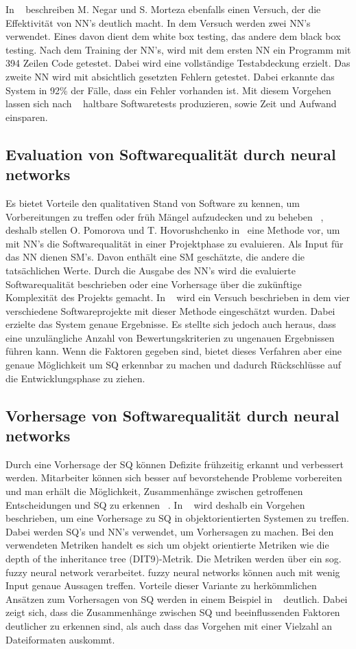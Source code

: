 \noindent In ~\cite{Majma2014} beschreiben M. Negar und S. Morteza ebenfalls einen Versuch, der die Effektivität von NN's deutlich macht. In dem Versuch werden zwei NN's verwendet. Eines davon dient dem white box testing, das andere dem black box testing. Nach dem Training der NN's, wird mit dem ersten NN ein Programm mit 394 Zeilen Code getestet. Dabei wird eine vollständige Testabdeckung erzielt. Das zweite NN wird mit absichtlich gesetzten Fehlern getestet. Dabei erkannte das System in 92\% der Fälle, dass ein Fehler vorhanden ist. Mit diesem Vorgehen lassen sich nach ~\cite{Majma2014} haltbare Softwaretests produzieren, sowie Zeit und Aufwand einsparen.

\subsection{Evaluation von Softwarequalität durch neural networks}
Es bietet Vorteile den qualitativen Stand von Software zu kennen, um Vorbereitungen zu treffen oder früh Mängel aufzudecken und zu beheben ~\cite{Pomorova2013}, deshalb stellen O. Pomorova und T. Hovorushchenko in~\cite{Pomorova2013} eine Methode vor, um mit NN's die Softwarequalität in einer Projektphase zu evaluieren. Als Input für das NN dienen SM's. Davon enthält eine SM geschätzte, die andere die tatsächlichen Werte.
Durch die Ausgabe des NN's wird die evaluierte Softwarequalität beschrieben oder eine Vorhersage über die zukünftige Komplexität des Projekts gemacht. 
In ~\cite{Pomorova2013} wird ein Versuch beschrieben in dem vier verschiedene Softwareprojekte mit dieser Methode eingeschätzt wurden. Dabei erzielte das System genaue Ergebnisse. Es stellte sich jedoch auch heraus, dass eine unzulängliche Anzahl von Bewertungskriterien zu ungenauen Ergebnissen führen kann.
Wenn die Faktoren gegeben sind, bietet dieses Verfahren aber eine genaue Möglichkeit um SQ erkennbar zu machen und dadurch Rückschlüsse auf die Entwicklungsphase zu ziehen.

\subsection{Vorhersage von Softwarequalität durch neural networks}
Durch eine Vorhersage der SQ können Defizite frühzeitig erkannt und verbessert werden. Mitarbeiter können sich besser auf bevorstehende Probleme vorbereiten und man erhält die Möglichkeit, Zusammenhänge zwischen getroffenen Entscheidungen und SQ zu erkennen ~\cite{Peng2009}. In ~\cite{Peng2009} wird deshalb ein Vorgehen beschrieben, um eine Vorhersage zu SQ in objektorientierten Systemen zu treffen. Dabei werden SQ's und NN's verwendet, um Vorhersagen zu machen. Bei den verwendeten Metriken handelt es sich um objekt orientierte Metriken wie die depth of the inheritance tree (DIT9)-Metrik. Die Metriken werden über ein sog. fuzzy neural network verarbeitet. fuzzy neural networks können auch mit wenig Input genaue Aussagen treffen.
Vorteile dieser Variante zu herkömmlichen Ansätzen zum Vorhersagen von SQ werden in einem Beispiel in ~\cite{Peng2009} deutlich. Dabei zeigt sich, dass die Zusammenhänge zwischen SQ und beeinflussenden Faktoren deutlicher zu erkennen sind, als auch dass das Vorgehen mit einer Vielzahl an Dateiformaten auskommt.
